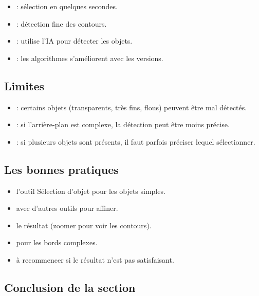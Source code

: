 \begin{itemize}
    \item {} : sélection en quelques secondes.
    \item {} : détection fine des contours.
    \item {} : utilise l'IA pour détecter les objets.
    \item {} : les algorithmes s'améliorent avec les versions.
\end{itemize}

\subsection{Limites}

\begin{itemize}
    \item {} : certains objets (transparents, très fins, flous) peuvent être mal détectés.
    \item {} : si l'arrière-plan est complexe, la détection peut être moins précise.
    \item {} : si plusieurs objets sont présents, il faut parfois préciser lequel sélectionner.
\end{itemize}

\subsection{Les bonnes pratiques}

\begin{itemize}
    \item {} l'outil Sélection d'objet pour les objets simples.
    \item {} avec d'autres outils pour affiner.
    \item {} le résultat (zoomer pour voir les contours).
    \item {} pour les bords complexes.
    \item {} à recommencer si le résultat n'est pas satisfaisant.
\end{itemize}

\subsection*{Conclusion de la section}

